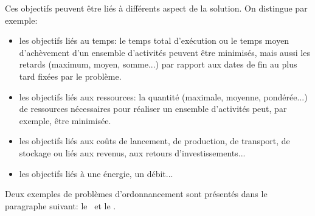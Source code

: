 Ces objectifs peuvent être liés à différents aspect de la solution. On
distingue par exemple:
\begin{itemize}
\item les objectifs liés au temps: le temps total d'exécution ou le temps moyen
  d'achèvement d'un ensemble d'activités peuvent être minimisés, mais
  aussi  les retards (maximum, moyen, somme...) par rapport
  aux dates de fin au plus tard fixées par le problème.
\item les objectifs liés aux ressources: la quantité (maximale,
  moyenne, pondérée...) de ressources nécessaires pour réaliser un
  ensemble d'activités peut, par exemple, être minimisée.
\item les objectifs liés aux coûts de lancement, de production, de
  transport, de stockage ou liés aux revenus, aux retours
  d'investissements... 
\item les objectifs liés à une énergie, un débit...
\end{itemize}

Deux exemples de problèmes d'ordonnancement sont présentés dans le
paragraphe suivant: le \RCPSP~et le \CUSP.